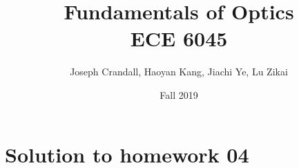 

\usepackage{subfiles}
\usepackage{color,soul}
\usepackage{siunitx}
\usepackage{gensymb}

\title{Fundamentals of Optics\\
\large ECE 6045}
\author{Joseph Crandall, Haoyan Kang, Jiachi Ye, Lu Zikai}
\date{Fall 2019}


\maketitle

\section{Solution to homework 04}



